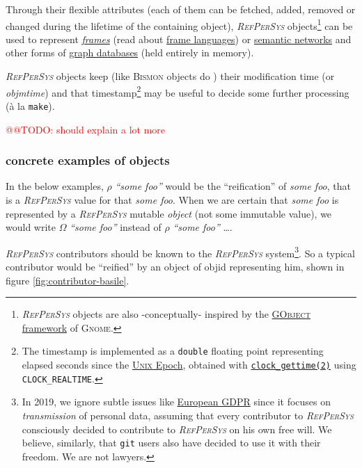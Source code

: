 \documentclass[11pt,a4paper,svgnames]{article}
\newcommand{\RefPerSys}{{\textit{\textsc{RefPerSys}}}}
\begin{document}
Through their flexible attributes (each of them can be fetched, added,
removed or changed during the lifetime of the containing object),
{\RefPerSys} objects\footnote{{\RefPerSys} objects are also -conceptually-
  inspired by the
  \href{https://developer.gnome.org/gobject/stable/}{\textsc{GObject}
    framework} of \textsc{Gnome}.} can be used to represent
\href{https://en.wikipedia.org/wiki/Frame_(artificial_intelligence)}{\emph{frames}}
(read about \href{https://en.wikipedia.org/wiki/Frame_language}{frame
  languages}) or
\href{https://en.wikipedia.org/wiki/Semantic_network}{semantic
  networks} and other forms of
\href{https://en.wikipedia.org/wiki/Graph_database}{graph databases}
(held entirely in memory).

{\RefPerSys} objects keep (like \textsc{Bismon} objects do
\cite{Starynkevitch:2019:bismon-draft}) their modification time (or
\emph{objmtime}) and that timestamp\footnote{The timestamp is
implemented as a \texttt{double} floating point representing elapsed
seconds since the
\href{https://en.wikipedia.org/wiki/Unix_time}{\textsc{Unix} Epoch},
obtained with
\href{http://man7.org/linux/man-pages/man2/clock_gettime.2.html}{\texttt{clock\_gettime(2)}}
using \texttt{CLOCK\_REALTIME}.} may be useful to decide some further
processing (à la \texttt{make}).

\smallskip

\textcolor{red}{@@TODO: should explain a lot more}

\bigskip

\subsubsection{concrete examples of objects}
\label{subsubsec:obj-examples}

In the below examples, $\rho$ \emph{``some foo''}  would be
the ``reification'' of \textit{some foo}, that is a {\RefPerSys} value
for that \textit{some foo}. When we are certain that \textit{some foo}
is represented by a {\RefPerSys} mutable \emph{object} (not some immutable value), we
would write $\Omega$  \emph{``some foo''} instead of
$\rho$  \emph{``some foo''} \ldots.

\medskip

{\RefPerSys} contributors should be known to the {\RefPerSys}
system\footnote{In 2019, we ignore subtle issues like
\href{https://eugdpr.org/}{European GDPR} since it focuses on
\emph{transmission} of personal data, assuming that every contributor
to {\RefPerSys} consciously decided to contribute to {\RefPerSys} on
his own free will. We believe, similarly, that \texttt{git} users
also have decided to use it with their freedom. We are not
lawyers.}. So a typical contributor would be ``reified'' by an object
of objid {} representing
him, shown in figure \ref{fig:contributor-basile}.
\end{document}

